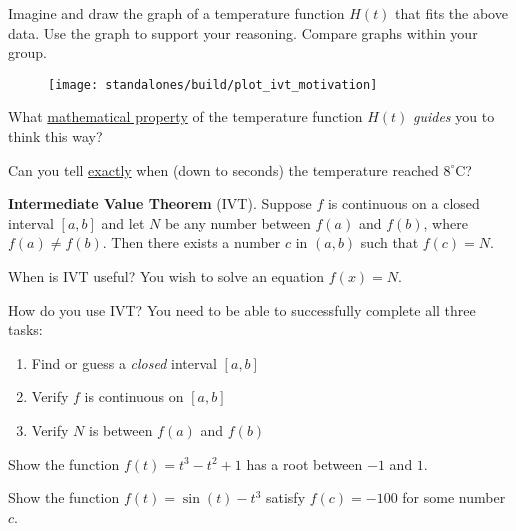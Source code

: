 \documentclass[../main.tex]{subfiles}
\begin{document}
Imagine and draw the graph of a temperature function \(H(t)\) that fits the above data. Use the graph to support your reasoning. Compare graphs within your group. 

\begin{figure}[!h]  %
  \centering
  \texttt{[image: standalones/build/plot\_ivt\_motivation]}
  \label{fig:label}
\end{figure}

What \underline{mathematical property} of the temperature function \(H(t)\) \emph{guides} you to think this way?
\vspace{1in}

Can you tell \underline{exactly} when (down to seconds) the temperature reached \(8^{\circ}\)C?
\clearpage

\begin{mdframed}[style=withref]
  \textbf{Intermediate Value Theorem} (IVT). Suppose \(f\) is continuous on a closed interval \([a,b]\) and let \(N\) be any number between \(f(a)\) and \(f(b)\), where \(f(a) \ne f(b)\). Then there exists a number \(c\) in \((a,b)\) such that \(f(c) = N\).

\end{mdframed}
When is IVT useful? You wish to {solve an equation \(f(x) = N\).}
\vspace{1cm}

How do you use IVT? You need to be able to successfully complete all three tasks: 
\begin{enumerate}[label=(IVT \arabic*)]
  \item Find or guess {a \emph{closed} interval \([a,b]\)}
  \item Verify {\(f\) is continuous on \([a,b]\)}
  \item Verify {\(N\) is between \(f(a)\) and \(f(b)\)}
\end{enumerate}
\bigskip

\begin{example}
  Show the function \(f(t) = t^{3} - t^{2} + 1\) has a root between \(-1\) and \(1\).
\end{example}
\vspace{2.5in}

\begin{example}
  Show the function \(f(t) = \sin(t) - t^{3}\) satisfy \(f(c) = -100\) for some number \(c\). 
\end{example}
\clearpage
\end{document}
